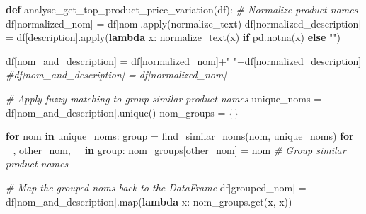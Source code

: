 \documentclass[
]{article}
\newenvironment{Shaded}{}{}
\newcommand{\BuiltInTok}[1]{\textcolor[rgb]{0.00,0.50,0.00}{#1}}
\newcommand{\CommentTok}[1]{\textcolor[rgb]{0.38,0.63,0.69}{\textit{#1}}}
\newcommand{\ControlFlowTok}[1]{\textcolor[rgb]{0.00,0.44,0.13}{\textbf{#1}}}
\newcommand{\KeywordTok}[1]{\textcolor[rgb]{0.00,0.44,0.13}{\textbf{#1}}}
\newcommand{\NormalTok}[1]{#1}
\newcommand{\OperatorTok}[1]{\textcolor[rgb]{0.40,0.40,0.40}{#1}}
\newcommand{\StringTok}[1]{\textcolor[rgb]{0.25,0.44,0.63}{#1}}
\begin{document}
\hypertarget{229e8403-b89b-4a0f-8bd9-112707e977d5}{}
\begin{Shaded}
\begin{Highlighting}[]
\KeywordTok{def}\NormalTok{ analyse\_get\_top\_product\_price\_variation(df):}
    \CommentTok{\# Normalize product names}
\NormalTok{    df[}\StringTok{\textquotesingle{}normalized\_nom\textquotesingle{}}\NormalTok{] }\OperatorTok{=}\NormalTok{ df[}\StringTok{\textquotesingle{}nom\textquotesingle{}}\NormalTok{].}\BuiltInTok{apply}\NormalTok{(normalize\_text)}
\NormalTok{    df[}\StringTok{\textquotesingle{}normalized\_description\textquotesingle{}}\NormalTok{] }\OperatorTok{=}\NormalTok{ df[}\StringTok{\textquotesingle{}description\textquotesingle{}}\NormalTok{].}\BuiltInTok{apply}\NormalTok{(}\KeywordTok{lambda}\NormalTok{ x: normalize\_text(x) }\ControlFlowTok{if}\NormalTok{ pd.notna(x) }\ControlFlowTok{else} \StringTok{""}\NormalTok{)}
    
\NormalTok{    df[}\StringTok{\textquotesingle{}nom\_and\_description\textquotesingle{}}\NormalTok{] }\OperatorTok{=}\NormalTok{ df[}\StringTok{\textquotesingle{}normalized\_nom\textquotesingle{}}\NormalTok{]}\OperatorTok{+}\StringTok{" "}\OperatorTok{+}\NormalTok{df[}\StringTok{\textquotesingle{}normalized\_description\textquotesingle{}}\NormalTok{]}
    \CommentTok{\#df[\textquotesingle{}nom\_and\_description\textquotesingle{}] = df[\textquotesingle{}normalized\_nom\textquotesingle{}]}
    
    \CommentTok{\# Apply fuzzy matching to group similar product names}
\NormalTok{    unique\_noms }\OperatorTok{=}\NormalTok{ df[}\StringTok{\textquotesingle{}nom\_and\_description\textquotesingle{}}\NormalTok{].unique()}
\NormalTok{    nom\_groups }\OperatorTok{=}\NormalTok{ \{\}}

    \ControlFlowTok{for}\NormalTok{ nom }\KeywordTok{in}\NormalTok{ unique\_noms:}
\NormalTok{        group }\OperatorTok{=}\NormalTok{ find\_similar\_noms(nom, unique\_noms)}
        \ControlFlowTok{for}\NormalTok{ \_, other\_nom, \_ }\KeywordTok{in}\NormalTok{ group:}
\NormalTok{            nom\_groups[other\_nom] }\OperatorTok{=}\NormalTok{ nom  }\CommentTok{\# Group similar product names}

    \CommentTok{\# Map the grouped noms back to the DataFrame}
\NormalTok{    df[}\StringTok{\textquotesingle{}grouped\_nom\textquotesingle{}}\NormalTok{] }\OperatorTok{=}\NormalTok{ df[}\StringTok{\textquotesingle{}nom\_and\_description\textquotesingle{}}\NormalTok{].}\BuiltInTok{map}\NormalTok{(}\KeywordTok{lambda}\NormalTok{ x: nom\_groups.get(x, x))}
    

\end{Highlighting}
\end{Shaded}
\end{document}
